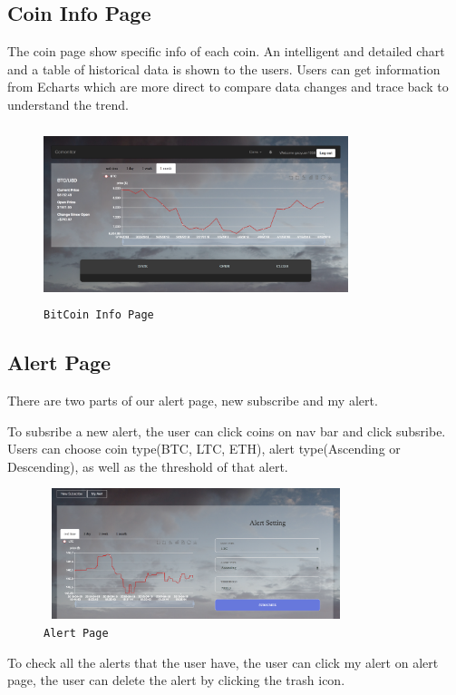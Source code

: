 \subsection{Coin Info Page}
The coin page show specific info of each coin. An intelligent and detailed chart 
and a table of historical data is shown to the users. Users can get information 
from Echarts which are more direct to compare data changes and trace back to understand the trend.

\begin{figure}[!htb]
\includegraphics[height=2.0in, width=3.5in]{coinpage.png}
\caption{\texttt{BitCoin Info Page}}
\end{figure}

\subsection{Alert Page}
There are two parts of our alert page, new subscribe and my alert.

To subsribe a new alert, the user can click coins on nav bar and click subsribe. Users
can choose coin type(BTC, LTC, ETH), alert type(Ascending or Descending), as well as the 
threshold of that alert.

\begin{figure}[!htb]
\includegraphics[height=1.5in, width=3.5in]{alert.png}
\caption{\texttt{Alert Page}}
\end{figure}


To check all the alerts that the user have, the user can click my alert on alert page,
the user can delete the alert by clicking the trash icon.


